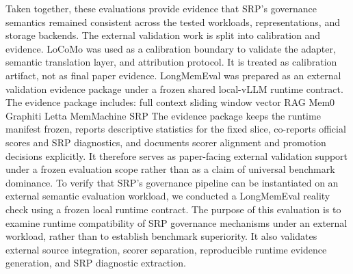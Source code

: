 {}\markdownRendererInterblockSeparator
{}\markdownRendererInterblockSeparator
{}\markdownRendererInterblockSeparator
{}Taken together, these evaluations provide evidence that SRP's governance semantics remained consistent across the tested workloads, representations, and storage backends.\markdownRendererInterblockSeparator
{}
\markdownRendererSectionEnd \markdownRendererSectionBegin
{}\markdownRendererInterblockSeparator
{}The external validation work is split into calibration and evidence.\markdownRendererParagraphSeparator
{}LoCoMo was used as a calibration boundary to validate the adapter, semantic translation layer, and attribution protocol. It is treated as calibration artifact, not as final paper evidence.\markdownRendererParagraphSeparator
{}LongMemEval was prepared as an external validation evidence package under a frozen shared local-vLLM runtime contract. The evidence package includes:\markdownRendererInterblockSeparator
{}\markdownRendererUlBeginTight
\markdownRendererUlItem full context\markdownRendererUlItemEnd 
\markdownRendererUlItem sliding window\markdownRendererUlItemEnd 
\markdownRendererUlItem vector RAG\markdownRendererUlItemEnd 
\markdownRendererUlItem Mem0\markdownRendererUlItemEnd 
\markdownRendererUlItem Graphiti\markdownRendererUlItemEnd 
\markdownRendererUlItem Letta\markdownRendererUlItemEnd 
\markdownRendererUlItem MemMachine\markdownRendererUlItemEnd 
\markdownRendererUlItem SRP\markdownRendererUlItemEnd 
\markdownRendererUlEndTight \markdownRendererInterblockSeparator
{}The evidence package keeps the runtime manifest frozen, reports descriptive statistics for the fixed slice, co-reports official scores and SRP diagnostics, and documents scorer alignment and promotion decisions explicitly. It therefore serves as paper-facing external validation support under a frozen evaluation scope rather than as a claim of universal benchmark dominance.\markdownRendererInterblockSeparator
{}\markdownRendererSectionBegin
{}\markdownRendererInterblockSeparator
{}To verify that SRP's governance pipeline can be instantiated on an external semantic evaluation workload, we conducted a LongMemEval reality check using a frozen local runtime contract. The purpose of this evaluation is to examine runtime compatibility of SRP governance mechanisms under an external workload, rather than to establish benchmark superiority. It also validates external source integration, scorer separation, reproducible runtime evidence generation, and SRP diagnostic extraction.\markdownRendererParagraphSeparator
